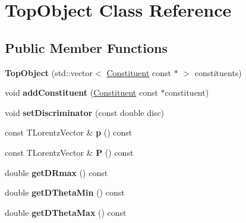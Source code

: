 \hypertarget{classTopObject}{\section{Top\-Object Class Reference}
\label{classTopObject}
}
\subsection*{Public Member Functions}
\begin{DoxyCompactItemize}
\item 
\hypertarget{classTopObject_a03208b96dc5bdb7bc271ad7303574b8e}{{\bfseries Top\-Object} (std\-::vector$<$ \hyperlink{classConstituent}{Constituent} const $\ast$ $>$ constituents)}\label{classTopObject_a03208b96dc5bdb7bc271ad7303574b8e}

\item 
\hypertarget{classTopObject_adafc98b5660ac2ca92f9115668de2c10}{void {\bfseries add\-Constituent} (\hyperlink{classConstituent}{Constituent} const $\ast$constituent)}\label{classTopObject_adafc98b5660ac2ca92f9115668de2c10}

\item 
\hypertarget{classTopObject_abf5123e8c707e9059c8ec96b35643bef}{void {\bfseries set\-Discriminator} (const double disc)}\label{classTopObject_abf5123e8c707e9059c8ec96b35643bef}

\item 
\hypertarget{classTopObject_a52fbbf2a336d0e174f509304f8c1c984}{const T\-Lorentz\-Vector \& {\bfseries p} () const }\label{classTopObject_a52fbbf2a336d0e174f509304f8c1c984}

\item 
\hypertarget{classTopObject_ac59c3a52925131b1ea7e5bf5c014aa2d}{const T\-Lorentz\-Vector \& {\bfseries P} () const }\label{classTopObject_ac59c3a52925131b1ea7e5bf5c014aa2d}

\item 
\hypertarget{classTopObject_ad6c8e1a0ef46d400075b1c2dbb05e37d}{double {\bfseries get\-D\-Rmax} () const }\label{classTopObject_ad6c8e1a0ef46d400075b1c2dbb05e37d}

\item 
\hypertarget{classTopObject_a6751962b83bc4b348cebee05aa23c299}{double {\bfseries get\-D\-Theta\-Min} () const }\label{classTopObject_a6751962b83bc4b348cebee05aa23c299}

\item 
\hypertarget{classTopObject_afd9525b26ff81392af3773c5c88f2f68}{double {\bfseries get\-D\-Theta\-Max} () const }\label{classTopObject_afd9525b26ff81392af3773c5c88f2f68}


\end{DoxyCompactItemize}
